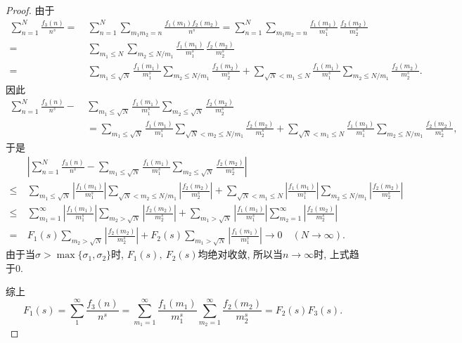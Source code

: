 \documentclass[12pt, a4paper, oneside]{ctexart}
\numberwithin{equation}{section}  %
\let\leq=\leqslant %
\begin{document}
\begin{proof}
    由于
    \begin{equation*}
        \begin{aligned}
            \sum_{n=1}^N\frac{f_3(n)}{n^s} =&\ \sum_{n=1}^N\sum_{m_1m_2 = n}\frac{f_1(m_1)f_2(m_2)}{n^s} = \sum_{n=1}^N\sum_{m_1m_2=n} \frac{f_1(m_1)}{m_1^s}\,\frac{f_2(m_2)}{m_2^s}\\
            =&\ \sum_{m_1\leq N}\sum_{m_2\leq N/m_1}\frac{f_1(m_1)}{m_1^s}\,\frac{f_2(m_2)}{m_2^s}\\
            =&\ \sum_{m_1\leq \sqrt{N}}\frac{f_1(m_1)}{m_1^s}\sum_{m_2\leq N/m_1}\frac{f_2(m_2)}{m_2^s}+\sum_{\sqrt{N}<m_1\leq N}\frac{f_1(m_1)}{m_1^s}\sum_{m_2\leq N/m_1}\frac{f_2(m_2)}{m_2^s}.
        \end{aligned}
    \end{equation*}
    因此
    \begin{equation*}
        \begin{aligned}
            \sum_{n=1}^N\frac{f_3(n)}{n^s}-&\ \sum_{m_1\leq \sqrt{N}}\frac{f_1(m_1)}{m_1^s}\sum_{m_2\leq \sqrt{N}}\frac{f_2(m_2)}{m_2^s}\\
            &\ =\sum_{m_1\leq \sqrt{N}}\frac{f_1(m_1)}{m_1^s}\sum_{\sqrt{N} < m_2\leq N/m_1}\frac{f_2(m_2)}{m_2^s}+\sum_{\sqrt{N}<m_1\leq N}\frac{f_1(m_1)}{m_1^s}\sum_{m_2\leq N/m_1}\frac{f_2(m_2)}{m_2^s},
        \end{aligned}
    \end{equation*}
    于是
    \begin{equation*}
        \begin{aligned}
            &\ \left|\sum_{n=1}^N\frac{f_3(n)}{n^s} -\sum_{m_1\leq \sqrt{N}}\frac{f_1(m_1)}{m_1^s}\sum_{m_2\leq \sqrt{N}}\frac{f_2(m_2)}{m_2^s}\right| \\
            \leq&\ \sum_{m_1\leq \sqrt{N}}\left|\frac{f_1(m_1)}{m_1^s}\right|\sum_{\sqrt{N} < m_2\leq N/m_1}\left|\frac{f_2(m_2)}{m_2^s}\right|+\sum_{\sqrt{N}<m_1\leq N}\left|\frac{f_1(m_1)}{m_1^s}\right|\sum_{m_2\leq N/m_1}\left|\frac{f_2(m_2)}{m_2^s}\right|\\
            \leq&\ \sum_{m_1=1}^\infty\left|\frac{f_1(m_1)}{m_1^s}\right|\sum_{m_2 > \sqrt{N}}\left|\frac{f_2(m_2)}{m_2^s}\right|+\sum_{m_1>\sqrt{N}}\left|\frac{f_1(m_1)}{m_1^s}\right|\sum_{m_2=1}^\infty\left|\frac{f_2(m_2)}{m_2^s}\right|\\
            =&\ F_1(s)\sum_{m_2>\sqrt{N}}\left|\frac{f_2(m_2)}{m_2^s}\right|+F_2(s)\sum_{m_1>\sqrt{N}}\left|\frac{f_1(m_1)}{m_1^s}\right|\to 0\quad(N\to \infty).
        \end{aligned}
    \end{equation*}
    由于当$\sigma > \max\{\sigma_1,\sigma_2\}$时, $F_1(s),\ F_2(s)$均绝对收敛, 所以当$n\to \infty$时, 上式趋于$0$.

    综上
    \begin{equation*}
        F_1(s) = \sum_{1}^\infty\frac{f_3(n)}{n^s}=\sum_{m_1=1}^\infty\frac{f_1(m_1)}{m_1^s}\sum_{m_2=1}^\infty\frac{f_2(m_2)}{m_2^s} = F_2(s)F_3(s).
    \end{equation*}
\end{proof}
\end{document}
